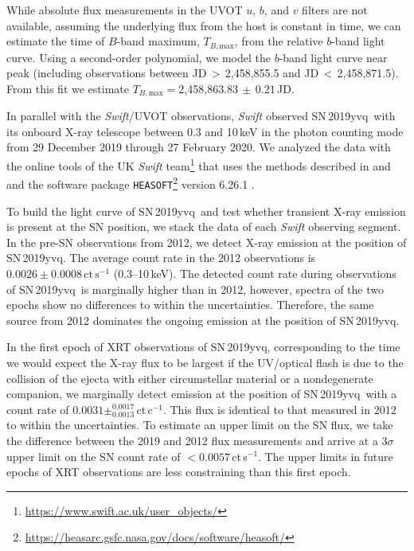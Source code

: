 \documentclass[twocolumn]{aastex63}
\newcommand{\tbmax}{$T_{B,\mathrm{max}}$}
\newcommand{\sn}{SN\,2019yvq}
\begin{document}
While absolute flux measurements in the UVOT $u$, $b$, and $v$ filters are not
available, assuming the underlying flux from the host is constant in time, we
can estimate the time of $B$-band maximum, \tbmax, from the relative $b$-band
light curve. Using a second-order polynomial, we model the $b$-band light
curve near peak (including observations between JD$\,> \,$2,458,855.5 and
JD$\,<\,$2,458,871.5). From this fit we estimate \tbmax$ = $2,458,863.83$
\,\pm \,0.21$\,JD.

In parallel with the \textit{Swift}/UVOT observations, \textit{Swift} observed
\sn\ with its onboard X-ray telescope \citep[XRT;][]{Burrows05} between 0.3
and 10\,keV in the photon counting mode from 29 December 2019 through 27
February 2020. We analyzed the data with the online tools of the UK
\textit{Swift}
team\footnote{\href{https://www.swift.ac.uk/user_objects/}{\url{https://www.swift.ac.uk/user_objects/}}} that uses the methods described in \citet{Evans07}
and \citet{Evans09} and the software package \texttt{HEASOFT}\footnote{
\href{https://heasarc.gsfc.nasa.gov/docs/software/heasoft/}{\url{https://heasarc.gsfc.nasa.gov/docs/software/heasoft/}}} version 6.26.1 \citep{Heasarc}.

To build the light curve of \sn\ and test whether transient X-ray emission is
present at the SN position, we stack the data of each \textit{Swift} observing
segment. In the pre-SN observations from 2012, we detect X-ray emission at the
position of \sn. The average count rate in the 2012 observations is
$0.0026\pm0.0008\,\mathrm{ct\,s}^{-1}$ (0.3--10\,keV). The detected count
rate during observations of \sn\ is marginally higher than in 2012, however,
spectra of the two epochs show no differences to within the uncertainties.
Therefore, the same source from 2012 dominates the ongoing emission at the
position of \sn.

In the first epoch of XRT observations of \sn, corresponding to the time we
would expect the X-ray flux to be largest if the UV/optical flash is due to
the collision of the ejecta with either circumstellar material or a
nondegenerate companion, we marginally detect emission at the position of \sn\
with a count rate of $0.0031 \pm^{0.0017}_{0.0013}$\,ct\,c$^{-1}$. This flux
is identical to that measured in 2012 to within the uncertainties. To estimate
an upper limit on the SN flux, we take the difference between the 2019 and
2012 flux measurements and arrive at a $3\sigma$ upper limit on the SN count
rate of $< 0.0057$\,ct\,s$^{-1}$. The upper limits in future epochs of XRT
observations are less constraining than this first epoch.
 
\end{document}
